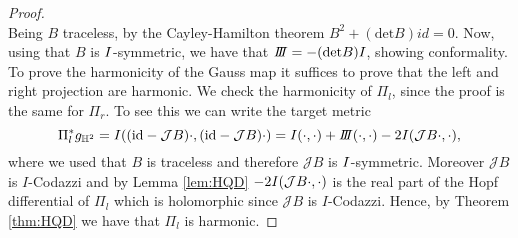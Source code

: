 \begin{proof}
\[    \]
    Being $B$ traceless, by the Cayley-Hamilton theorem $B^2 + (\text{det}B)id = 0$. Now, using that $B$ is $I$-symmetric, we have that $\III = -(\text{det}B)I$, showing conformality.\\
    To prove the harmonicity of the Gauss map it suffices to prove that the left and right projection are harmonic. We check the harmonicity of $\Pi_l$, since the proof is the same for $\Pi_r$. To see this we can write the target metric
    \[
        \Pi_l^*g_{\H^2}=I((\text{id}-\mathcal{J}B)\cdot,(\text{id}-\mathcal{J}B)\cdot) = \I(\cdot, \cdot) + \III(\cdot, \cdot) - 2\I(\mathcal{J}B \cdot, \cdot),
    \]
    where we used that $B$ is traceless and therefore $\mathcal{J}B$ is $I$-symmetric. Moreover $\mathcal{J} B$ is $I$-Codazzi and by Lemma \ref{lem:HQD} $- 2I(\mathcal{J}B \cdot, \cdot)$ is the real part of the Hopf differential of $\Pi_l$ which is holomorphic since $\mathcal{J}B$ is $I$-Codazzi. Hence, by Theorem \ref{thm:HQD} we have that $\Pi_l$ is harmonic.
\end{proof}

